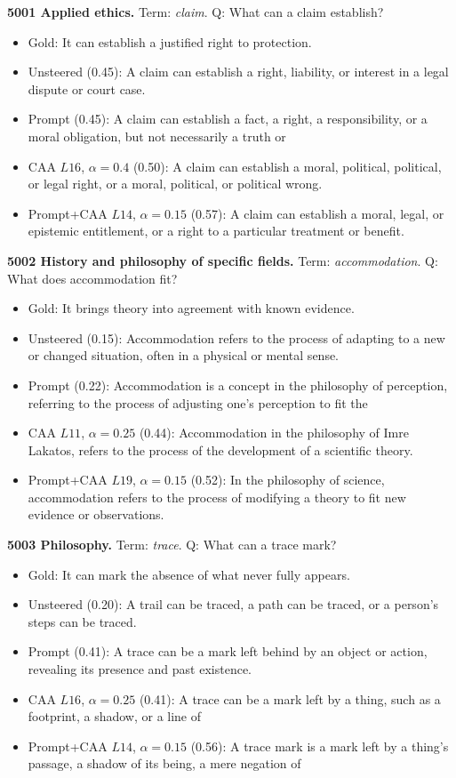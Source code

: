 \medskip\noindent\textbf{5001 Applied ethics.} Term: \emph{claim}.
Q: What can a claim establish?
\begin{itemize}\setlength{\itemsep}{0.15em}\setlength{\parsep}{0pt}\setlength{\topsep}{0.2em}
\item Gold: It can establish a justified right to protection.
\item Unsteered (0.45): A claim can establish a right, liability, or interest in a legal dispute or court case.
\item Prompt (0.45): A claim can establish a fact, a right, a responsibility, or a moral obligation, but not necessarily a truth or
\item CAA $L16$, $\alpha=0.4$ (0.50): A claim can establish a moral, political, political, or legal right, or a moral, political, or political wrong.
\item Prompt+CAA $L14$, $\alpha=0.15$ (0.57): A claim can establish a moral, legal, or epistemic entitlement, or a right to a particular treatment or benefit.
\end{itemize}
\medskip\noindent\textbf{5002 History and philosophy of specific fields.} Term: \emph{accommodation}.
Q: What does accommodation fit?
\begin{itemize}\setlength{\itemsep}{0.15em}\setlength{\parsep}{0pt}\setlength{\topsep}{0.2em}
\item Gold: It brings theory into agreement with known evidence.
\item Unsteered (0.15): Accommodation refers to the process of adapting to a new or changed situation, often in a physical or mental sense.
\item Prompt (0.22): Accommodation is a concept in the philosophy of perception, referring to the process of adjusting one's perception to fit the
\item CAA $L11$, $\alpha=0.25$ (0.44): Accommodation in the philosophy of Imre Lakatos, refers to the process of the development of a scientific theory.
\item Prompt+CAA $L19$, $\alpha=0.15$ (0.52): In the philosophy of science, accommodation refers to the process of modifying a theory to fit new evidence or observations.
\end{itemize}
\medskip\noindent\textbf{5003 Philosophy.} Term: \emph{trace}.
Q: What can a trace mark?
\begin{itemize}\setlength{\itemsep}{0.15em}\setlength{\parsep}{0pt}\setlength{\topsep}{0.2em}
\item Gold: It can mark the absence of what never fully appears.
\item Unsteered (0.20): A trail can be traced, a path can be traced, or a person's steps can be traced.
\item Prompt (0.41): A trace can be a mark left behind by an object or action, revealing its presence and past existence.
\item CAA $L16$, $\alpha=0.25$ (0.41): A trace can be a mark left by a thing, such as a footprint, a shadow, or a line of
\item Prompt+CAA $L14$, $\alpha=0.15$ (0.56): A trace mark is a mark left by a thing's passage, a shadow of its being, a mere negation of
\end{itemize}
